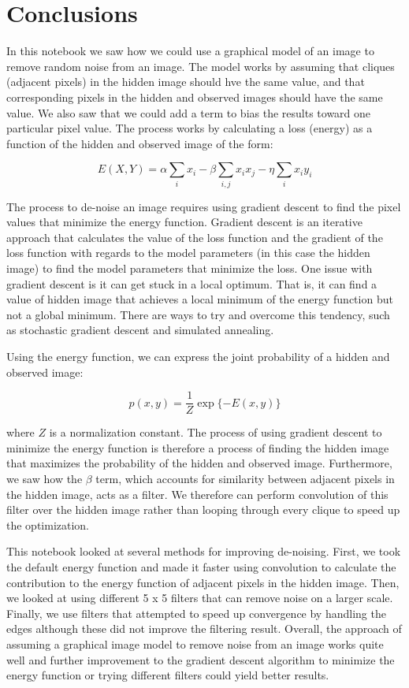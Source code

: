 \documentclass[11pt]{article}
\begin{document}
    \hypertarget{conclusions}{%
\section{Conclusions}\label{conclusions}}

In this notebook we saw how we could use a graphical model of an image
to remove random noise from an image. The model works by assuming that
cliques (adjacent pixels) in the hidden image should hve the same value,
and that corresponding pixels in the hidden and observed images should
have the same value. We also saw that we could add a term to bias the
results toward one particular pixel value. The process works by
calculating a loss (energy) as a function of the hidden and observed
image of the form:

\[E(X,Y) = \alpha\sum\limits_{i} x_i - \beta \sum\limits_{i,j} x_i x_j - \eta \sum\limits_{i} x_i y_i \]

The process to de-noise an image requires using gradient descent to find
the pixel values that minimize the energy function. Gradient descent is
an iterative approach that calculates the value of the loss function and
the gradient of the loss function with regards to the model parameters
(in this case the hidden image) to find the model parameters that
minimize the loss. One issue with gradient descent is it can get stuck
in a local optimum. That is, it can find a value of hidden image that
achieves a local minimum of the energy function but not a global
minimum. There are ways to try and overcome this tendency, such as
stochastic gradient descent and simulated annealing.

Using the energy function, we can express the joint probability of a
hidden and observed image:

\[p(x, y) = \frac{1}{Z} \exp\{-E(x,y)\}\]

where \(Z\) is a normalization constant. The process of using gradient
descent to minimize the energy function is therefore a process of
finding the hidden image that maximizes the probability of the hidden
and observed image. Furthermore, we saw how the \(\beta\) term, which
accounts for similarity between adjacent pixels in the hidden image,
acts as a filter. We therefore can perform convolution of this filter
over the hidden image rather than looping through every clique to speed
up the optimization.

This notebook looked at several methods for improving de-noising. First,
we took the default energy function and made it faster using convolution
to calculate the contribution to the energy function of adjacent pixels
in the hidden image. Then, we looked at using different 5 x 5 filters
that can remove noise on a larger scale. Finally, we use filters that
attempted to speed up convergence by handling the edges although these
did not improve the filtering result. Overall, the approach of assuming
a graphical image model to remove noise from an image works quite well
and further improvement to the gradient descent algorithm to minimize
the energy function or trying different filters could yield better
results.
\end{document}
